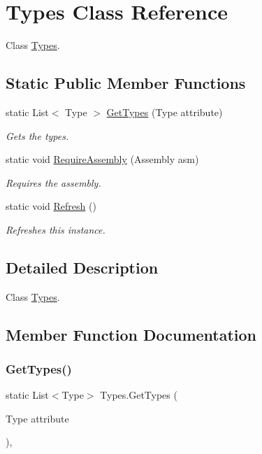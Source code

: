 \hypertarget{class_types}{}\section{Types Class Reference}
\label{class_types}


Class \hyperlink{class_types}{Types}.  


\subsection*{Static Public Member Functions}
\begin{DoxyCompactItemize}
\item 
static List$<$ Type $>$ \hyperlink{class_types_a05d02b649323af054607953d55099f65}{Get\+Types} (Type attribute)
\begin{DoxyCompactList}\small\item\em Gets the types. \end{DoxyCompactList}\item 
static void \hyperlink{class_types_a157e849f1304407e36661a88d1e2232a}{Require\+Assembly} (Assembly asm)
\begin{DoxyCompactList}\small\item\em Requires the assembly. \end{DoxyCompactList}\item 
static void \hyperlink{class_types_a4b66ac1c7bbb19873c851c1967ee2060}{Refresh} ()
\begin{DoxyCompactList}\small\item\em Refreshes this instance. \end{DoxyCompactList}\end{DoxyCompactItemize}


\subsection{Detailed Description}
Class \hyperlink{class_types}{Types}. 



\subsection{Member Function Documentation}
\mbox{\label{class_types_a05d02b649323af054607953d55099f65}} 
\subsubsection{\texorpdfstring{Get\+Types()}{GetTypes()}}
{\footnotesize\ttfamily static List$<$Type$>$ Types.\+Get\+Types (\begin{DoxyParamCaption}\item[{Type}]{attribute }\end{DoxyParamCaption})\hspace{0.3cm}{\ttfamily [inline]}, {\ttfamily [static]}}



